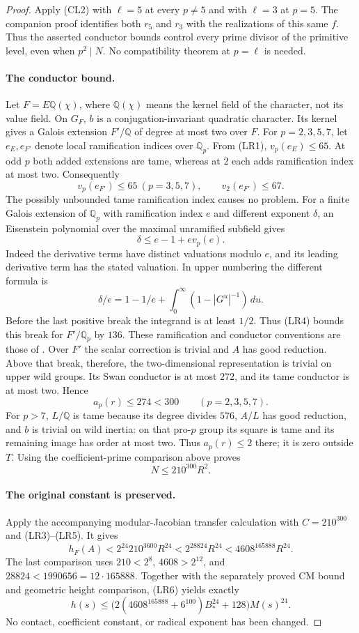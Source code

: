 \documentclass[11pt]{article}
\theoremstyle{definition}
\theoremstyle{remark}
\begin{document}
\begin{proof}
Apply (CL2) with $\ell=5$ at every $p\ne5$ and with $\ell=3$ at
$p=5$. The companion proof identifies both $r_5$ and $r_3$ with
the realizations of this same $f$. Thus the asserted conductor
bounds control every prime divisor of the primitive level, even
when $p^2\mid N$. No compatibility theorem at $p=\ell$ is needed.

\paragraph{The conductor bound.}
Let $F=E\mathbb Q(\chi)$, where $\mathbb Q(\chi)$ means the kernel
field of the character, not its value field. On $G_F$, $b$ is a
conjugation-invariant quadratic character. Its kernel gives a Galois
extension $F'/\mathbb Q$ of degree at most two over $F$.
For $p=2,3,5,7$, let $e_E,e_{F'}$ denote local ramification indices
over $\mathbb Q_p$. From (LR1), $v_p(e_E)\le65$.
At odd $p$ both added extensions are tame, whereas at $2$ each
adds ramification index at most two. Consequently
\[
 v_p(e_{F'})\le65\ (p=3,5,7),\qquad v_2(e_{F'})\le67.
\tag{LR4}
\]
The possibly unbounded tame ramification index causes no problem.
For a finite Galois extension of $\mathbb Q_p$ with ramification
index $e$ and different exponent $\delta$, an Eisenstein polynomial
over the maximal unramified subfield gives
\[
 \delta\le e-1+ev_p(e).
\]
Indeed the derivative terms have distinct valuations modulo $e$,
and its leading derivative term has the stated valuation. In upper
numbering the different formula is
\[
 \delta/e=1-1/e+\int_0^\infty(1-|G^u|^{-1})\,du.
\]
Before the last positive break the integrand is at least $1/2$.
Thus (LR4) bounds this break for $F'/\mathbb Q_p$ by $136$.
These ramification and conductor conventions are those of
\cite[\S\S4.1--4.3, pp.~155--159]{serrelocal}.
Over $F'$ the scalar correction is trivial and $A$ has good reduction.
Above that break, therefore, the two-dimensional representation is
trivial on upper wild groups. Its Swan conductor is at most $272$,
and its tame conductor is at most two. Hence
\[
 a_p(r)\le274<300\qquad(p=2,3,5,7).
\]
For $p>7$, $L/\mathbb Q$ is tame because its degree divides $576$,
$A/L$ has good reduction, and $b$ is trivial on wild inertia:
on that pro-$p$ group its square is tame and its remaining image has
order at most two. Thus $a_p(r)\le2$ there; it is zero outside $T$.
Using the coefficient-prime comparison above proves
\[
 N\le210^{300}R^2.
\tag{LR5}
\]

\paragraph{The original constant is preserved.}
Apply the accompanying modular-Jacobian transfer calculation with
$C=210^{300}$ and (LR3)--(LR5). It gives
\[
 h_F(A)<2^{24}210^{3600}R^{24}
 <2^{28824}R^{24}<4608^{165888}R^{24}.
\tag{LR6}
\]
The last comparison uses $210<2^8$, $4608>2^{12}$, and
$28824<1990656=12\cdot165888$. Together with the separately proved
CM bound and geometric height comparison, (LR6) yields exactly
\[
 h(s)\le
 \bigl(2(4608^{165888}+6^{100})B_*^{24}+128\bigr)M(s)^{24}.
\]
No contact, coefficient constant, or radical exponent has been changed.


\end{proof}
\end{document}
